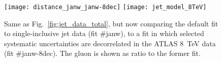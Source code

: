 \begin{figure}[!t]
    \centering
    \texttt{[image: distance\_janw\_janw-8dec]}
    \texttt{[image: jet\_model\_8TeV]}\\
    \caption{Same as Fig.~\ref{fig:jet_data_total}, but now comparing
      the default fit to single-inclusive jet data (fit \#janw), to a fit in which selected systematic uncertainties
      are decorrelated in the ATLAS 8~TeV data (fit \#janw-8dec). The gluon is  shown as ratio to the former fit.}
    \label{fig:jet_data_model_8TeV} 
\end{figure}